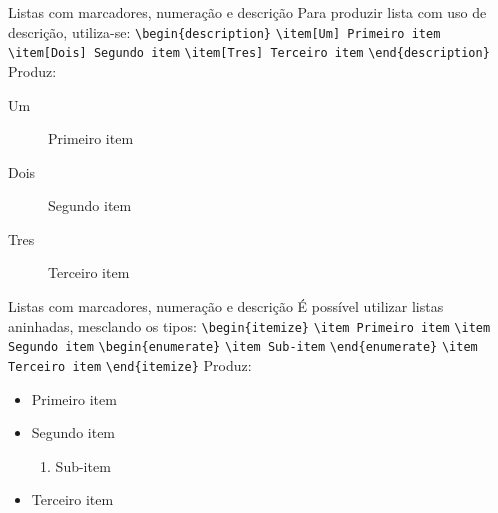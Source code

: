 \begin{frame}[fragile]{Listas com marcadores, numera{\c c}\~ao e descri{\c c}\~ao}
Para produzir lista com uso de descri{\c c}\~ao, utiliza-se: \newline
\verb|\begin{description}|\newline
\verb|\item[Um] Primeiro item| \newline
\verb|\item[Dois] Segundo item| \newline
\verb|\item[Tres] Terceiro item| \newline
\verb|\end{description}|
\newline \newline
Produz:
\begin{description}
\item[Um] Primeiro item
\item[Dois] Segundo item
\item[Tres] Terceiro item
\end{description}
\end{frame}



\begin{frame}[fragile]{Listas com marcadores, numera{\c c}\~ao e descri{\c c}\~ao}
\'E poss\'ivel utilizar listas aninhadas, mesclando os tipos: \newline
\verb|\begin{itemize}|\newline
\verb|\item Primeiro item| \newline
\verb|\item Segundo item| \newline
\verb|\begin{enumerate}| \newline
\verb|\item Sub-item| \newline
\verb|\end{enumerate}| \newline
\verb|\item Terceiro item| \newline
\verb|\end{itemize}| \newline
Produz:
\begin{itemize}
\item Primeiro item 
\item Segundo item
\begin{enumerate}
\item Sub-item
\end{enumerate}
\item Terceiro item
\end{itemize}
\end{frame}


